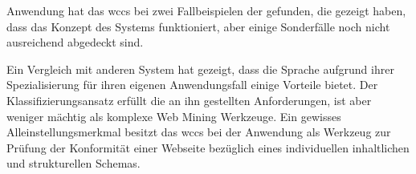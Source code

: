     Anwendung hat das \gls{wccs} bei zwei Fallbeispielen der {\fernUni} gefunden,
    die gezeigt haben, dass das Konzept des Systems funktioniert,
    aber einige Sonderfälle noch nicht ausreichend abgedeckt sind.

    Ein Vergleich mit anderen System hat gezeigt,
    dass die Sprache aufgrund ihrer Spezialisierung für ihren eigenen
    Anwendungsfall einige Vorteile bietet.
    Der Klassifizierungsansatz erfüllt die an ihn gestellten Anforderungen,
    ist aber weniger mächtig als komplexe Web Mining Werkzeuge.
    Ein gewisses Alleinstellungsmerkmal besitzt das \gls{wccs}
    bei der Anwendung als Werkzeug zur Prüfung der Konformität
    einer Webseite bezüglich eines individuellen inhaltlichen und strukturellen Schemas.